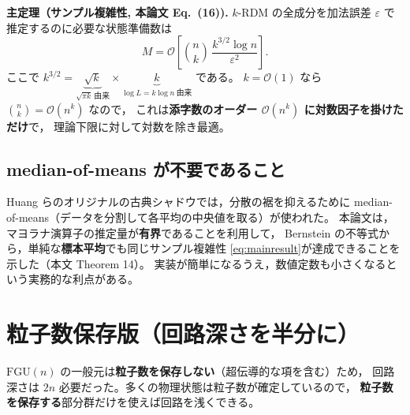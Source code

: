 \documentclass[11pt,a4paper]{ltjsarticle}
\newcommand{\FGU}{\mathrm{FGU}}
\theoremstyle{definition}
\theoremstyle{plain}
\begin{document}
\begin{keybox}
\textbf{主定理（サンプル複雑性, 本論文 Eq.~(16)).}\;
$k$-RDM の全成分を加法誤差 $\varepsilon$ で推定するのに必要な状態準備数は
\begin{equation}
  M=\mathcal{O}\!\left[\binom{n}{k}\,
     \frac{k^{3/2}\log n}{\varepsilon^2}\right].
  \label{eq:mainresult}
\end{equation}
ここで $k^{3/2}=\underbrace{\sqrt{k}}_{\sqrt{\pi k}\ \text{由来}}
\times\underbrace{k}_{\log L=k\log n\ \text{由来}}$ である。
$k=\mathcal O(1)$ なら $\binom nk=\mathcal O(n^k)$ なので，
これは\textbf{添字数のオーダー $\mathcal O(n^k)$ に対数因子を掛けただけ}で，
理論下限に対して対数を除き最適。
\end{keybox}

\subsection{median-of-means が不要であること}
Huang らのオリジナルの古典シャドウでは，分散の裾を抑えるために
median-of-means（データを分割して各平均の中央値を取る）が使われた。
本論文は，マヨラナ演算子の推定量が\textbf{有界}であることを利用して，
Bernstein の不等式から，単純な\textbf{標本平均}でも同じサンプル複雑性
\eqref{eq:mainresult}が達成できることを示した（本文 Theorem 14）。
実装が簡単になるうえ，数値定数も小さくなるという実務的な利点がある。

\section{粒子数保存版（回路深さを半分に）}\label{sec:nc}

$\FGU(n)$ の一般元は\textbf{粒子数を保存しない}（超伝導的な項を含む）ため，
回路深さは $2n$ 必要だった。多くの物理状態は粒子数が確定しているので，
\textbf{粒子数を保存する}部分群だけを使えば回路を浅くできる。
\end{document}
